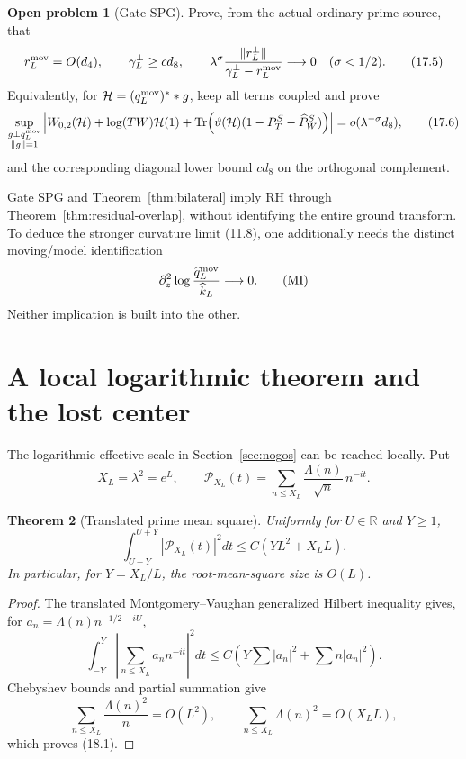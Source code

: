 \documentclass[11pt]{amsart}
\newtheorem{theorem}{Theorem}[section]
\theoremstyle{definition}
\newtheorem{problem}[theorem]{Open problem}
\theoremstyle{remark}
\newcommand{\R}{\mathbb R}
\newcommand{\Tr}{\operatorname{Tr}}
\begin{document}
\begin{problem}[Gate SPG]
\label{prob:spg}
Prove, from the actual ordinary-prime source, that
\[
 r_L^{\rm mov}=O(d_4),
 \qquad
 \gamma_L^\perp\ge c d_8,
 \qquad
 \lambda^\sigma
 \frac{\|r_L^\perp\|}
      {\gamma_L^\perp-r_L^{\rm mov}}
 \longrightarrow0
 \quad(\sigma<1/2).
 \tag{17.5}
\]
Equivalently, for \(\mathcal H=(q_L^{\rm mov})^**g\), keep all terms
coupled and prove
\[
 \sup_{\substack{g\perp q_L^{\rm mov}\\\|g\|=1}}
 \left|
 W_{0,2}(\mathcal H)+\log(TW)\mathcal H(1)
 +\Tr\!\left(\vartheta(\mathcal H)
   (1-P_T^S-\widehat P_W^S)\right)
 \right|
 =o(\lambda^{-\sigma}d_8),
 \tag{17.6}
\]
and the corresponding diagonal lower bound \(cd_8\) on the orthogonal
complement.
\end{problem}

Gate SPG and Theorem~\ref{thm:bilateral} imply RH through
Theorem~\ref{thm:residual-overlap}, without identifying the entire ground
transform.  To deduce the stronger curvature limit (11.8), one additionally
needs the distinct moving/model identification
\[
 \partial_z^2\log
 \frac{\widehat q_L^{\rm mov}}{\widehat k_L}\longrightarrow0.
 \tag{MI}
\]
Neither implication is built into the other.

\section{A local logarithmic theorem and the lost center}
\label{sec:local-log}

The logarithmic effective scale in Section~\ref{sec:nogos} can be reached
locally.  Put
\[
 X_L=\lambda^2=e^L,
 \qquad
 \mathcal P_{X_L}(t)
 =\sum_{n\le X_L}\frac{\Lambda(n)}{\sqrt n}\,n^{-it}.
\]

\begin{theorem}[Translated prime mean square]
\label{thm:mv}
Uniformly for \(U\in\R\) and \(Y\ge1\),
\[
 \boxed{
 \int_{U-Y}^{U+Y}|\mathcal P_{X_L}(t)|^2dt
 \le C(YL^2+X_LL).}
 \tag{18.1}
\]
In particular, for \(Y=X_L/L\), the root-mean-square size is \(O(L)\).
\end{theorem}

\begin{proof}
The translated Montgomery--Vaughan generalized Hilbert inequality
\cite{MV} gives, for \(a_n=\Lambda(n)n^{-1/2-iU}\),
\[
 \int_{-Y}^{Y}\left|\sum_{n\le X_L}a_nn^{-it}\right|^2dt
 \le C\left(Y\sum|a_n|^2+\sum n|a_n|^2\right).
\]
Chebyshev bounds and partial summation give
\[
 \sum_{n\le X_L}\frac{\Lambda(n)^2}{n}=O(L^2),
 \qquad
 \sum_{n\le X_L}\Lambda(n)^2=O(X_LL),
\]
which proves (18.1).
\end{proof}
\end{document}
